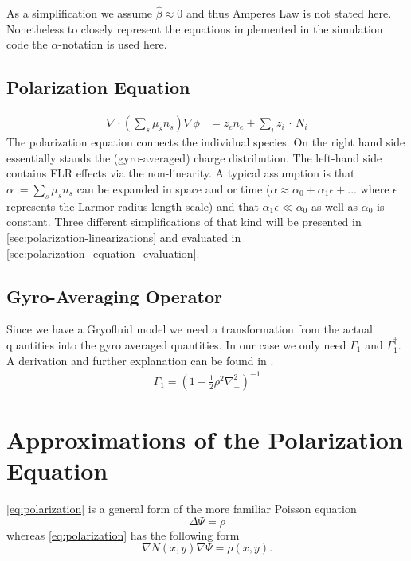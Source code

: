 \documentclass[master.tex]{subfiles}
\begin{document}
As a simplification we assume $\hat{\beta} \approx 0$ and thus Amperes Law is not stated here. Nonetheless to closely represent the equations implemented in the simulation code the $\alpha$-notation is used here.

\subsection{Polarization Equation}

\begin{align}
    \nabla \cdot \left( \sum_s \mu_s n_s \right) \nabla \phi &= z_e n_e + \sum_i z_i \, \cdot \, N_i \label{eq:polarization}
\end{align}
The polarization equation connects the individual species. On the right hand side essentially stands the (gyro-averaged) charge distribution. The left-hand side contains \ac{FLR} effects via the non-linearity. A typical assumption is that $\alpha := \sum_s \mu_s n_s$ can be expanded in space and or time ($\alpha \approx \alpha_0 + \alpha_1 \epsilon + ...$ where $\epsilon$ represents the Larmor radius length scale) and that $\alpha_1 \epsilon \ll \alpha_0$ as well as $\alpha_0$ is constant. Three different simplifications of that kind will be presented in \autoref{sec:polarization-linearizations} and evaluated in \autoref{sec:polarization_equation_evaluation}. 


\subsection{Gyro-Averaging Operator}
Since we have a Gryofluid model we need a transformation from the actual quantities into the gyro averaged quantities. In our case we only need $\Gamma_1$ and $\Gamma_1^\dagger$. A derivation and further explanation can be found in \cite{HeldDisseration}.
\begin{align}
    \Gamma_1 = \left(1- \frac{1}{2} \rho^2 \nabla_\perp^2\right)^{-1}
\end{align}


\section{Approximations of the Polarization Equation} \label{sec:polarization-linearizations}
\autoref{eq:polarization} is a general form of the more familiar Poisson equation
\begin{equation}\label{eq:linear-poisson-equation}
    \Delta \Psi = \rho 
\end{equation}
whereas \autoref{eq:polarization} has the following form
\begin{equation}\label{eq:general-poisson}
    \nabla N(x,y) \nabla \Psi = \rho(x,y).
\end{equation}
\end{document}
